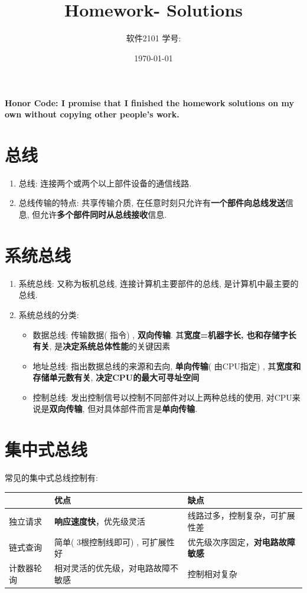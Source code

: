 \documentclass[11pt]{article}  %
\title{\vspace{-4cm}\CourseCodeName \space
        \Session \protect\\  Homework-\textbf{\Homework} Solutions}
\author{软件2101 \Name \space 学号: \SID}
\date{\today}
\begin{document}
\maketitle

\textbf{Honor Code: I promise that I finished the homework solutions on my own without copying other people's 
    work.}

\section{总线}
\begin{enumerate}
    \item 总线: 连接两个或两个以上部件设备的通信线路. 
    \item 总线传输的特点: 共享传输介质, 在任意时刻只允许有\textbf{一个部件向总线发送}信息, 但允许\textbf{多个部件同时从总线接收}信息. 
\end{enumerate}

\section{系统总线}
\begin{enumerate}
    \item 系统总线: 又称为板机总线, 连接计算机主要部件的总线, 是计算机中最主要的总线.  
    \item 系统总线的分类: 
    \begin{itemize}
        \item 数据总线: 传输数据( 指令) , \textbf{双向传输}. 其\textbf{宽度=机器字长, 也和存储字长有关}, 是\textbf{决定系统总体性能}的关键因素
        \item 地址总线: 指出数据总线的来源和去向, \textbf{单向传输}( 由CPU指定) , 其\textbf{宽度和存储单元数有关}, 
            \textbf{决定CPU的最大可寻址空间} 
        \item 控制总线: 发出控制信号以控制不同部件对以上两种总线的使用, 对CPU来说是\textbf{双向传输}, 但对具体部件而言是\textbf{单向传输}. 
    \end{itemize}
\end{enumerate}

\section{集中式总线}

常见的集中式总线控制有: 
\begin{table}[]
    \begin{tabular}{|l|l|l|}
        \hline
              & 优点                   & 缺点                        \\ \hline
        独立请求  & \textbf{响应速度快}，优先级灵活          & 线路过多，控制复杂，可扩展性差 \\ \hline
        链式查询  & 简单( 3根控制线即可) , 可扩展性好 & 优先级次序固定，\textbf{对电路故障敏感} \\ \hline
        计数器轮询 & 相对灵活的优先级，对电路故障不敏感    & 控制相对复杂                    \\ \hline
    \end{tabular}
\end{table}
\end{document}
